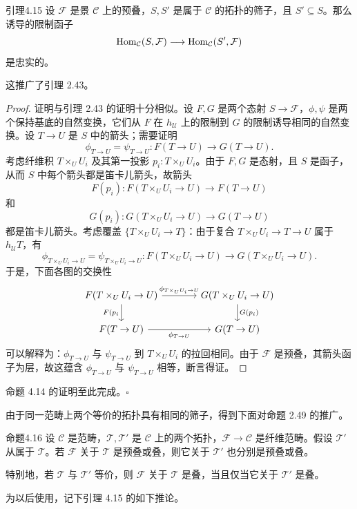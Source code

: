 
\begin{origstatement}{引理}{4.15}\label{ch04:lem415}
设 $\mathcal F$ 是景 $\mathcal C$ 上的预叠，$S,S'$ 是属于 $\mathcal C$ 的拓扑的筛子，且 $S'\subseteq S$。那么诱导的限制函子
\[
 \operatorname{Hom}_{\mathcal C}(S,\mathcal F)\longrightarrow\operatorname{Hom}_{\mathcal C}(S',\mathcal F)
\]
是忠实的。
\end{origstatement}
这推广了引理 2.43。
\begin{proof}
证明与引理 2.43 的证明十分相似。设 $F,G$ 是两个态射 $S\to\mathcal F$，$\phi,\psi$ 是两个保持基底的自然变换，它们从 $F$ 在 $h_{\mathcal U}$ 上的限制到 $G$ 的限制诱导相同的自然变换。设 $T\to U$ 是 $S$ 中的箭头；需要证明
\[
 \phi_{T\to U}=\psi_{T\to U}\colon F(T\to U)\longrightarrow G(T\to U).
\]
考虑纤维积 $T\times_U U_i$ 及其第一投影 $p_i\colon T\times_U U_i$。由于 $F,G$ 是态射，且 $S$ 是函子，从而 $S$ 中每个箭头都是笛卡儿箭头，故箭头
\[
 F(p_i)\colon F(T\times_U U_i\to U)\longrightarrow F(T\to U)
\]
和
\[
 G(p_i)\colon G(T\times_U U_i\to U)\longrightarrow G(T\to U)
\]
都是笛卡儿箭头。考虑覆盖 $\{T\times_U U_i\to T\}$：由于复合 $T\times_U U_i\to T\to U$ 属于 $h_{\mathcal U}T$，有
\[
 \phi_{T\times_U U_i\to U}=\psi_{T\times_U U_i\to U}
 \colon F(T\times_U U_i\to U)\longrightarrow G(T\times_U U_i\to U).
\]
于是，下面各图的交换性
\[
\begin{tikzcd}[column sep=large]
 F(T\times_U U_i\to U)\arrow[r,"{\phi_{T\times_U U_i\to U}}"]\arrow[d,"{F(p_i}"']&G(T\times_U U_i\to U)\arrow[d,"{G(p_i)}"]\\
 F(T\to U)\arrow[r,"{\phi_{T\to U}}"']&G(T\to U)
\end{tikzcd}
\]
可以解释为：$\phi_{T\to U}$ 与 $\psi_{T\to U}$ 到 $T\times_U U_i$ 的拉回相同。由于 $\mathcal F$ 是预叠，其箭头函子为层，故这蕴含 $\phi_{T\to U}$ 与 $\psi_{T\to U}$ 相等，断言得证。
\end{proof}

命题 4.14 的证明至此完成。\hfill$\square$

由于同一范畴上两个等价的拓扑具有相同的筛子，得到下面对命题 2.49 的推广。

\begin{origstatement}{命题}{4.16}\label{ch04:prop416}
设 $\mathcal C$ 是范畴，$\mathcal T,\mathcal T'$ 是 $\mathcal C$ 上的两个拓扑，$\mathcal F\to\mathcal C$ 是纤维范畴。假设 $\mathcal T'$ 从属于 $\mathcal T$。若 $\mathcal F$ 关于 $\mathcal T$ 是预叠或叠，则它关于 $\mathcal T'$ 也分别是预叠或叠。

特别地，若 $\mathcal T$ 与 $\mathcal T'$ 等价，则 $\mathcal F$ 关于 $\mathcal T$ 是叠，当且仅当它关于 $\mathcal T'$ 是叠。
\end{origstatement}
为以后使用，记下引理 4.15 的如下推论。

